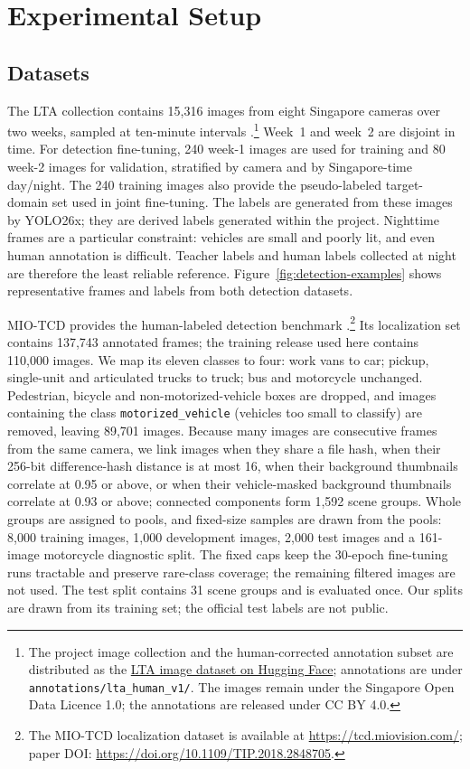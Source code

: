 \section{Experimental Setup}\label{sec:setup}

\subsection{Datasets}\label{sec:setup-data}

The LTA collection contains 15,316 images from eight Singapore cameras over two
weeks, sampled at ten-minute intervals
\parencite{ltatrafficimages2026}.\footnote{The project image collection and the
human-corrected annotation subset are distributed as the
\href{https://huggingface.co/datasets/LOVEIII486/isy5002-lta-traffic-images}{LTA
image dataset on Hugging Face}; annotations are under
\texttt{annotations/lta\_human\_v1/}. The images remain under the Singapore Open
Data Licence 1.0; the annotations are released under CC BY 4.0.}
Week~1 and week~2 are disjoint in time.
For detection fine-tuning, 240 week-1 images are used for training and 80
week-2 images for validation, stratified by camera and by Singapore-time
day/night. The 240 training images also provide the pseudo-labeled
target-domain set used in joint fine-tuning. The labels are generated from
these images by YOLO26x; they are derived labels generated within the project.
Nighttime frames are a particular constraint: vehicles are small and poorly
lit, and even human annotation is difficult. Teacher labels and human labels
collected at night are therefore the least reliable reference.
Figure~\ref{fig:detection-examples} shows representative frames and labels from
both detection datasets.

MIO-TCD provides the human-labeled detection benchmark
\parencite{luo2018miotcd}.\footnote{The MIO-TCD localization dataset is
available at \url{https://tcd.miovision.com/}; paper DOI:
\url{https://doi.org/10.1109/TIP.2018.2848705}.}
Its localization set contains 137,743 annotated frames; the training release
used here contains 110,000 images. We map its eleven classes to four: work vans
to car; pickup, single-unit and articulated trucks to truck; bus and motorcycle
unchanged. Pedestrian, bicycle and non-motorized-vehicle boxes are dropped, and
images containing the class \texttt{motorized\_vehicle} (vehicles too small to
classify) are removed, leaving 89,701 images. Because many images are consecutive
frames from the same camera, we link images when they share a file hash, when
their 256-bit difference-hash distance is at most 16, when their background
thumbnails correlate at 0.95 or above, or when their vehicle-masked background
thumbnails correlate at 0.93 or above; connected components form 1,592 scene
groups. Whole groups are assigned to pools, and fixed-size samples are drawn
from the pools: 8,000 training images, 1,000 development images, 2,000 test
images and a 161-image motorcycle diagnostic split. The fixed caps keep the
30-epoch fine-tuning runs tractable and preserve rare-class coverage; the
remaining filtered images are not used. The test split contains 31 scene groups
and is evaluated once. Our splits are drawn from its training set; the official
test labels are not public.


